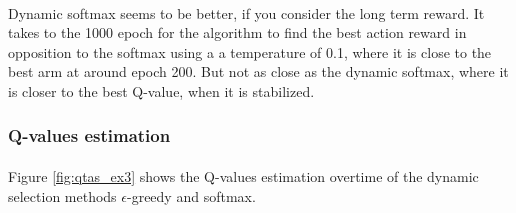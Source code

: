 \documentclass[letterpaper]{article}
\begin{document}
\paragraph{}


Dynamic softmax seems to be better, if you consider the long term reward.
It takes to the 1000 epoch for the algorithm to find the best action reward in
opposition to the softmax using a a temperature of 0.1, where it
is close to the best arm at around epoch 200. But not as close as
the dynamic softmax, where it is closer to the best Q-value, when it
is stabilized.

\subsubsection{Q-values estimation}

\paragraph{}

Figure \ref{fig:qtas_ex3} shows the Q-values estimation overtime of
the dynamic selection methods $\epsilon$-greedy and softmax.
\end{document}
